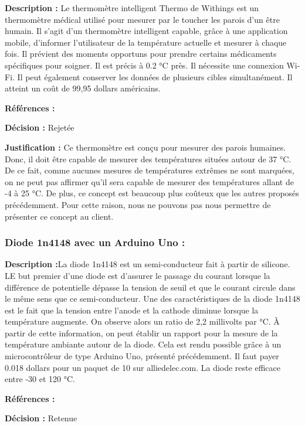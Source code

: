 \textbf{Description :} Le thermomètre intelligent Thermo de Withings est un thermomètre médical utilisé pour mesurer par le toucher les parois d’un être humain. Il s’agit d’un thermomètre intelligent capable, grâce à une application mobile, d’informer l’utilisateur de la température actuelle et mesurer à chaque fois. Il prévient des moments opportuns pour prendre certains médicaments spécifiques pour soigner. Il est précis à 0.2 °C près. Il nécessite une connexion Wi-Fi. Il peut également conserver les données de plusieurs cibles simultanément. Il atteint un coût de 99,95 dollars américains.

\textbf{Références :} \cite{Thermo}

\textbf{Décision :} Rejetée

\textbf{Justification :} Ce thermomètre est conçu pour mesurer des parois humaines. Donc, il doit être capable de mesurer des températures situées autour de 37 °C. De ce fait, comme aucunes mesures de températures extrêmes ne sont marquées, on ne peut pas affirmer qu’il sera capable de mesurer des températures allant de -4 à 25 °C. De plus, ce concept est beaucoup plus coûteux que les autres proposés précédemment. Pour cette raison, nous ne pouvons pas nous permettre de présenter ce concept au client. 

\subsubsection{Diode 1n4148 avec un Arduino Uno : }
\label{1n4}

\textbf{ Description :}La diode 1n4148 est un semi-conducteur fait à partir de silicone. LE but premier d’une diode est d’assurer le passage du courant lorsque la différence de potentielle dépasse la tension de seuil et que le courant circule dans le même sens que ce semi-conducteur. Une des caractéristiques de la diode 1n4148 est le fait que la tension entre l’anode et la cathode diminue lorsque la température augmente. On observe alors un ratio de 2,2 millivolts par °C. À partir de cette information, on peut établir un rapport pour la mesure de la température ambiante autour de la diode. Cela est rendu possible grâce à un microcontrôleur de type Arduino Uno, présenté précédemment. Il faut payer 0.018 dollars pour un paquet de 10 sur alliedelec.com. La diode reste efficace entre -30 et 120 °C.

\textbf{Références :} \cite{Allie} \cite{Tu1n}  \cite{Da1n}

\textbf{Décision :} Retenue

